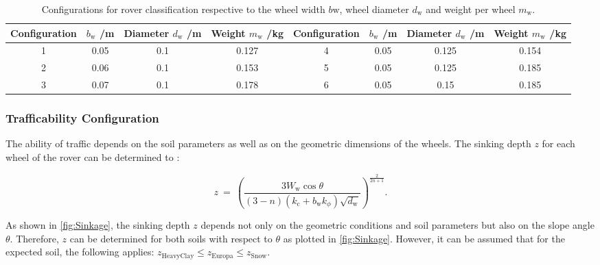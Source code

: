 \begin{table}[htb]
\centering
\caption{Configurations for rover classification respective to the wheel width \(b\text{w}\), wheel diameter \(d_\text{w}\) and weight per wheel \(m_\text{w}\).}
\begin{adjustbox}{max width=\textwidth}
\begin{tabular}{cccc|cccc}

	\toprule
		\multicolumn{1}{l}{Configuration} & \multicolumn{1}{c}{\(b_\text{w}\) /m} & \multicolumn{1}{c}{Diameter \(d_\text{w}\) /m} & \multicolumn{1}{c|}{Weight \(m_\text{w}\) /kg} &  \multicolumn{1}{l}{Configuration} & \multicolumn{1}{c}{\(b_\text{w}\) /m} & \multicolumn{1}{c}{Diameter \(d_\text{w}\) /m} & \multicolumn{1}{c}{Weight \(m_\text{w}\) /kg}  \\

	\midrule
		
		1	&	0.05	&	0.1		&	0.127		& 	4	&	0.05	&	0.125	&	0.154	\\
		2	&	0.06	&	0.1		&	0.153		&	5	&	0.05	&	0.125	&	0.185	\\
		3	&	0.07	&	0.1		&	0.178		& 	6	&	0.05	&	0.15	&	0.185	\\

	\bottomrule
	
\end{tabular}
\end{adjustbox}
\label{tab:Configurations}
\end{table}



\subsubsection*{Trafficability Configuration}
\label{sec:DP}

The ability of traffic depends on the soil parameters as well as on the geometric dimensions of the wheels. The sinking depth \(z\) for each wheel of the rover can be determined to \cite{Parameters}:

\begin{equation}
	z \:  = \:	\left( \frac{3 W_\text{w} \cos \theta}{(3-n)(k_\text{c} + b_\text{w}k_\phi) \sqrt{d_\text{w}}} \right) ^{\frac{2}{2n+1}}	.
	\label{eq:Sinkage}
\end{equation}

As shown in \autoref{fig:Sinkage}, the sinking depth \(z\) depends not only on the geometric conditions and soil parameters but also on the slope angle \(\theta\). Therefore, \(z\) can be determined for both soils with respect to \(\theta\) as plotted in \autoref{fig:Sinkage}. However, it can be assumed that for the expected soil, the following applies: \( z_{\text{HeavyClay}} \leq z_{\text{Europa}} \leq z_{\text{Snow}} \).

